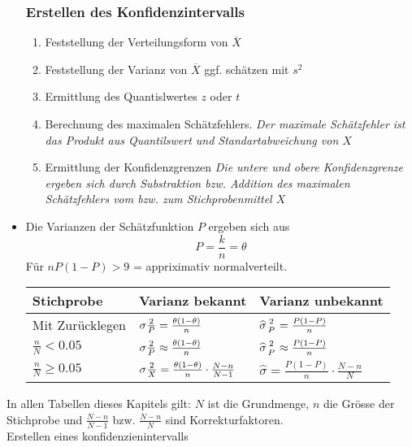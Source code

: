 \begin{itemize}
\subsubsection{Erstellen des Konfidenzintervalls}
\begin{enumerate}
	\item Feststellung der Verteilungsform von $\overline{X}$
	\item Feststellung der Varianz von $\overline{X}$ ggf. schätzen mit $s^2$
	\item Ermittlung des Quantislwertes $z$ oder $t$
	\item Berechnung des maximalen Schätzfehlers. \emph{Der maximale Schätzfehler ist das Produkt aus Quantilswert und Standartabweichung von $X$}
	\item Ermittlung der Konfidenzgrenzen \emph{Die untere und obere Konfidenzgrenze ergeben sich durch Substraktion bzw. Addition des maximalen Schätzfehlers vom bzw. zum Stichprobenmittel $X$}
\end{enumerate}
\item Die Varianzen der Schätzfunktion $P$ ergeben sich aus
\begin{equation}
P=\frac{k}{n} = \theta
\end{equation}
Für $nP(1-P) > 9$ = appriximativ normalverteilt.
\begin{table}[ht]
\centering
\begin{tabular}{@{}lll@{}}
\toprule
Stichprobe & Varianz bekannt & Varianz unbekannt \\ \midrule
Mit Zurücklegen & $\sigma {2 \atop \overline{P}} = \frac{\theta(1-\theta)}{n}$ & $\widehat{\sigma}{2 \atop P} = \frac{P(1-P)}{n}$ \\
$\frac{n}{N}< 0.05$ & $\sigma {2 \atop \overline{P}} \approx \frac{\theta(1-\theta)}{n}$ & $\widehat{\sigma}{2 \atop P}\approx\frac{P(1-P)}{n}$ \\
$\frac{n}{N}\geq 0.05$ & $\sigma {2 \atop \overline{X}}=\frac{\theta(1-\theta)}{n}\cdot\frac{N-n}{N-1}$ & $\widehat{\sigma}=\frac{P(1-P)}{n}\cdot\frac{N-n}{N}$ \\ \bottomrule
\end{tabular}
\end{table}
\end{itemize}
In allen Tabellen dieses Kapitels gilt: $N$ ist die Grundmenge, $n$ die Grösse der Stichprobe und $\frac{N-n}{N-1}$ bzw. $\frac{N-n}{N}$ sind Korrekturfaktoren.\\
Erstellen eines konfidenzienintervalls
